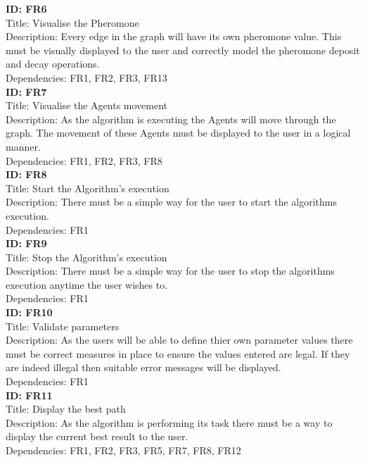 \documentclass[10pt,a4paper]{article}
\begin{document}
\noindent
\textbf{ID: FR6}\\
Title: Visualise the Pheromone\\
Description: Every edge in the graph will have its own pheromone value. This must be visually displayed to the user and correctly model the pheromone deposit and decay operations.\\
Dependencies: FR1, FR2, FR3, FR13
\\

\noindent
\textbf{ID: FR7}\\
Title: Visualise the Agents movement\\
Description: As the algorithm is executing the Agents will move through the graph. The movement of these Agents must be displayed to the user in a logical manner.\\
Dependencies: FR1, FR2, FR3, FR8
\\

\noindent
\textbf{ID: FR8}\\
Title: Start the Algorithm's execution\\
Description: There must be a simple way for the user to start the algorithms execution. \\
Dependencies: FR1
\\

\noindent
\textbf{ID: FR9}\\
Title: Stop the Algorithm's execution\\
Description: There must be a simple way for the user to stop the algorithms execution anytime the user wishes to. \\
Dependencies: FR1
\\

\noindent
\textbf{ID: FR10}\\
Title: Validate parameters\\
Description: As the users will be able to define thier own parameter values there must be correct measures in place to ensure the values entered are legal. If they are indeed illegal then suitable error messages will be displayed. \\
Dependencies: FR1
\\

\noindent
\textbf{ID: FR11}\\
Title: Display the best path\\
Description: As the algorithm is performing its task there must be a way to display the current best result to the user. \\
Dependencies: FR1, FR2, FR3, FR5, FR7, FR8, FR12
\\
\end{document}

